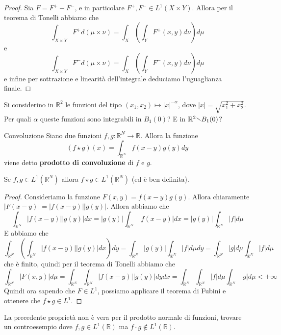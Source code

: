 \begin{proof}
    Sia \(F = F^{+} - F^{-}\), e in particolare \(F^{+}, F^{-} \in L^{1}(X
    \times Y)\). Allora per il teorema di Tonelli abbiamo che
    \[
        \int_{X \times Y} F^{+} d(\mu \times \nu) = \int_X \left( \int_Y F^{+}(x,y)
        d\nu \right) d\mu
    \]
    e
    \[
        \int_{X \times Y} F^{-} d(\mu \times \nu) = \int_X \left( \int_Y F^{-}(x,y)
        d\nu \right) d\mu
    \]
    e infine per sottrazione e linearità dell'integrale deduciamo l'uguaglianza
    finale.
\end{proof}
\begin{eser}
    Si considerino in \(\mathbb{R}^2\) le funzioni del tipo \((x_{1}, x_{2})
    \mapsto |x|^{-\alpha}\), dove \(|x| = \sqrt{x_{1}^2 + x_{2}^2}\). Per quali
    \(\alpha\) queste funzioni sono integrabili in \(B_{1}(0)\)? E in
    \(\mathbb{R}^2 \sminus B_{1}(0)\)?
\end{eser}
\begin{definition}{Convoluzione}
    Siano due funzioni \(f, g : \mathbb{R}^{N} \to \mathbb{R}\). Allora la
    funzione
    \[
        (f \star g)(x) = \int_{\mathbb{R}^{N}} f(x-y) g(y) dy
    \]
    viene detto \textbf{prodotto di convoluzione} di \(f\) e \(g\).
\end{definition}
\begin{proposition}
    Se \(f, g \in L^{1}(\mathbb{R}^{N})\) allora \(f \star g \in
    L^{1}(\mathbb{R}^{N})\) (ed è ben definita).
\end{proposition}
\begin{proof}
    Consideriamo la funzione \(F(x, y) = f(x-y) g(y)\). Allora chiaramente
    \(|F(x-y)| = |f(x-y)||g(y)|\). Allora abbiamo che
    \[
\int_{\mathbb{R}^{N}}
        |f(x-y)||g(y)| dx = |g(y)| \int_{\mathbb{R}^{N}} |f(x-y)| dx = |g(y)|
        \int_{\mathbb{R}^{N}} |f| d\mu
    \]
    E abbiamo che
    \[
        \int_{\mathbb{R}^{N}} {\left( \int_{\mathbb{R}^{N}} |f(x-y)| |g(y)| dx
        \right)} dy = \int_{\mathbb{R}^{N}} |g(y)| \int_{\mathbb{R}^{N}} |f|
        d\mu dy = \int_{\mathbb{R}^{N}} |g| d\mu \int_{\mathbb{R}^{N}} |f| d\mu
    \]
    che è finito, quindi per il teorema di Tonelli abbiamo che
    \[
        \int_{\mathbb{R}^{N}} |F(x, y)| d\mu =
         \int_{\mathbb{R}^{N}}
        \int_{\mathbb{R}^{N}} |f(x-y)||g(y)| dy dx = \int_{\mathbb{R}^{N}}
        \int_{\mathbb{R}^{N}}|f|d\mu \int_{\mathbb{R}^{N}} |g|d\mu < +\infty    
    \]
    Quindi ora sapendo che \(F \in L^{1}\), possiamo applicare il teorema di
    Fubini e ottenere che \(f \star g \in L^{1}\).
\end{proof}
\begin{eser}
    La precedente proprietà non è vera per il prodotto normale di funzioni,
    trovare un controesempio dove \(f, g \in L^{1}(\mathbb{R})\) ma \(f \cdot g
    \not\in L^{1}(\mathbb{R})\).
\end{eser}

